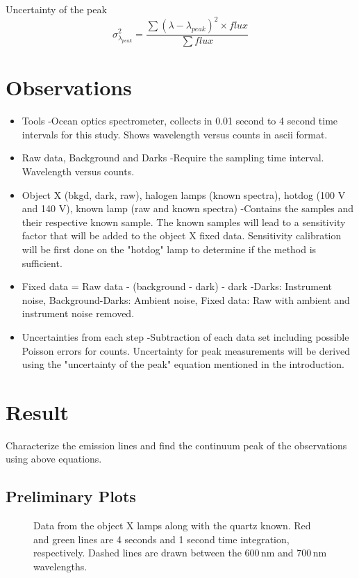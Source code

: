 \documentclass[twocolumn]{aastex6}
\begin{document}
Uncertainty of the peak
\begin{equation}
\sigma_{\lambda_{peak}}^2 = \frac{\sum(\lambda - \lambda_{peak})^2 \times flux}{\sum flux}
\end{equation}

\section{Observations}
\begin{itemize}
	\item{Tools}
-Ocean optics spectrometer, collects in 0.01 second to 4 second time intervals for this study. Shows wavelength versus counts in ascii format. 
	\item{Raw data, Background and Darks}
-Require the sampling time interval. Wavelength versus counts. 
	\item{Object X (bkgd, dark, raw), halogen lamps (known spectra), hotdog (100 V and 140 V), known lamp (raw and known spectra)}
-Contains the samples and their respective known sample. The known samples will lead to a sensitivity factor that will be added to the object X fixed data. Sensitivity calibration will be first done on the "hotdog" lamp to determine if the method is sufficient.
	\item{Fixed data = Raw data - (background - dark) - dark}
-Darks: Instrument noise, Background-Darks: Ambient noise, Fixed data: Raw with ambient and instrument noise removed.
	\item{Uncertainties from each step}
-Subtraction of each data set including possible Poisson errors for counts. Uncertainty for peak measurements will be derived using the "uncertainty of the peak" equation mentioned in the introduction.
\end{itemize}

\section{Result}

Characterize the emission lines and find the continuum peak of the observations using above equations.


\subsection{Preliminary Plots}
\begin{figure}[ht]
  \centering
  \caption{Data from the object X lamps along with the quartz known. Red and green lines are 4 seconds and 1 second time integration, respectively. Dashed lines are drawn between the 600\,nm and 700\,nm wavelengths.}
  \label{graphs}
\end{figure}
\end{document}
